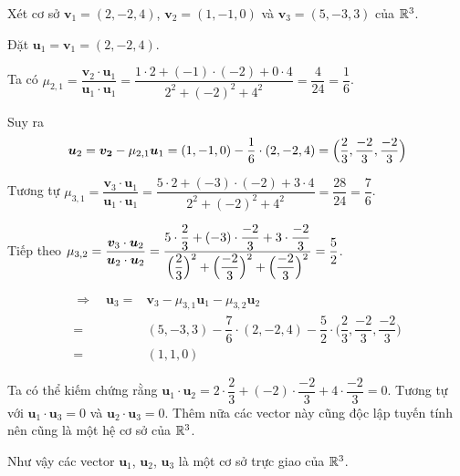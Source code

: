 \begin{example}
	Xét cơ sở $\bm{v}_1 = (2, -2, 4)$, $\bm{v}_2 = (1, -1, 0)$ và $\bm{v}_3 = (5, -3, 3)$ của $\mathbb{R}^3$.
	
	Đặt $\bm{u}_1 = \bm{v}_1 = (2, -2, 4)$.
	
	Ta có $\mu_{2,1} = \dfrac{\bm{v}_2 \cdot \bm{u}_1}{\bm{u}_1 \cdot \bm{u}_1} = \dfrac{1 \cdot 2 + (-1) \cdot (-2) + 0 \cdot 4}{2^2 + (-2)^2 + 4^2} = \dfrac{4}{24} = \dfrac{1}{6}$.
	
	Suy ra \[\bm{u}_2 = \bm{v_2} - \mu_{2, 1} \bm{u}_1 = (1, -1, 0) - \dfrac{1}{6} \cdot (2, -2, 4) = \Bigl(\dfrac{2}{3}, \dfrac{-2}{3}, \dfrac{-2}{3}\Bigr)\]
	
	Tương tự $\mu_{3, 1} = \dfrac{\bm{v}_3 \cdot \bm{u}_1}{\bm{u}_1 \cdot \bm{u}_1} = \dfrac{5 \cdot 2 + (-3) \cdot (-2) + 3 \cdot 4}{2^2 + (-2)^2 + 4^2} = \dfrac{28}{24} = \dfrac{7}{6}$.
	
	Tiếp theo $\mu_{3,2} = \dfrac{\bm{v}_3 \cdot \bm{u}_2}{\bm{u}_2 \cdot \bm{u}_2} = \dfrac{5 \cdot \dfrac{2}{3} + (-3) \cdot \dfrac{-2}{3} + 3 \cdot \dfrac{-2}{3}}{ \Bigl(\dfrac{2}{3}\Bigr)^2 + \Bigl(\dfrac{-2}{3}\Bigr)^2 + \Bigl(\dfrac{-2}{3}\Bigr)^2 } = \dfrac{5}{2}$.
	
	\begin{align*}
		\Rightarrow \quad \bm{u}_3 = & \bm{v}_3 - \mu_{3,1} \bm{u}_1 - \mu_{3,2} \bm{u}_2 \\ = & (5, -3, 3) - \dfrac{7}{6} \cdot (2, -2, 4) - \dfrac{5}{2} \cdot \Big(\dfrac{2}{3}, \dfrac{-2}{3}, \dfrac{-2}{3}\Big) \\ = & (1, 1, 0)
	\end{align*}
	
	Ta có thể kiếm chứng rằng $\bm{u}_1 \cdot \bm{u}_2 = 2 \cdot \dfrac{2}{3} + (-2) \cdot \dfrac{-2}{3} + 4 \cdot \dfrac{-2}{3} = 0$. Tương tự với $\bm{u}_1 \cdot \bm{u}_3 = 0$ và $\bm{u}_2 \cdot \bm{u}_3 = 0$. Thêm nữa các vector này cũng độc lập tuyến tính nên cũng là một hệ cơ sở của $\mathbb{R}^3$.
	
	Như vậy các vector $\bm{u}_1$, $\bm{u}_2$, $\bm{u}_3$ là một cơ sở trực giao của $\mathbb{R}^3$.
\end{example}